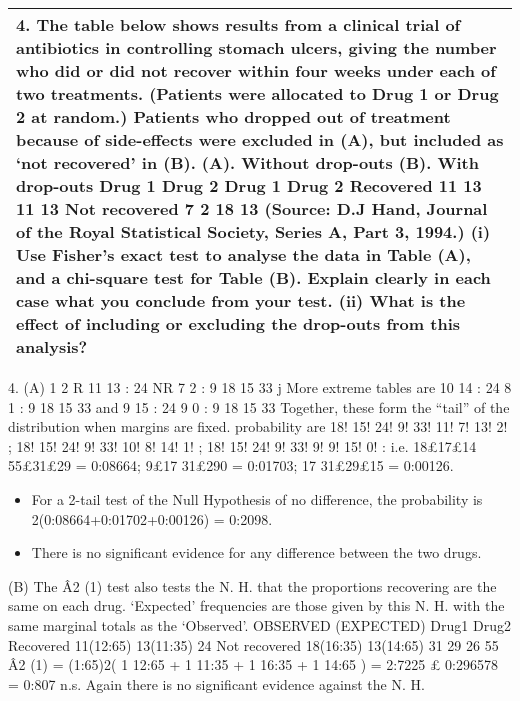 \documentclass[a4paper,12pt]{article}
\begin{document}
\begin{table}[ht!]
     
\centering
     
\begin{tabular}{|p{15cm}|}
     
\hline    
4. The table below shows results from a clinical trial of antibiotics in controlling stomach
ulcers, giving the number who did or did not recover within four weeks under each of two
treatments. (Patients were allocated to Drug 1 or Drug 2 at random.) Patients who dropped
out of treatment because of side-effects were excluded in (A), but included as ‘not
recovered’ in (B).
(A). Without drop-outs (B). With drop-outs
Drug 1 Drug 2 Drug 1 Drug 2
Recovered 11 13 11 13
Not recovered 7 2 18 13
(Source: D.J Hand, Journal of the Royal Statistical Society, Series A, Part 3, 1994.)
(i) Use Fisher’s exact test to analyse the data in Table (A), and a chi-square test for
Table (B). Explain clearly in each case what you conclude from your test.
(ii) What is the effect of including or excluding the drop-outs from this analysis?
\\ \hline
      
\end{tabular}
    
\end{table}
4. (A)
1 2
R 11 13 : 24
NR 7 2 : 9
18 15 33
j
More extreme tables are
10 14 : 24
8 1 : 9
18 15 33
and 9 15 : 24
9 0 : 9
18 15 33
Together, these form the “tail” of the distribution when margins are fixed.
probability are
18! 15! 24! 9!
33! 11! 7! 13! 2!
;
18! 15! 24! 9!
33! 10! 8! 14! 1!
;
18! 15! 24! 9!
33! 9! 9! 15! 0! :
i.e. 18£17£14
55£31£29 = 0:08664; 9£17
31£290 = 0:01703; 17
31£29£15 = 0:00126.
\begin{itemize}
    \item For a 2-tail test of the Null Hypothesis of no difference, the probability is
2(0:08664+0:01702+0:00126) = 0:2098. 
\item There is no significant evidence for
any difference between the two drugs.

\end{itemize}

(B) The Â2
(1) test also tests the N. H. that the proportions recovering are the
same on each drug. ‘Expected’ frequencies are those given by this N. H. with
the same marginal totals as the ‘Observed’.
OBSERVED (EXPECTED) Drug1 Drug2
Recovered 11(12:65) 13(11:35) 24
Not recovered 18(16:35) 13(14:65) 31
29 26 55
Â2
(1) = (1:65)2( 1
12:65 + 1
11:35 + 1
16:35 + 1
14:65 ) = 2:7225 £ 0:296578 = 0:807 n.s.
Again there is no significant evidence against the N. H.
\end{document}
